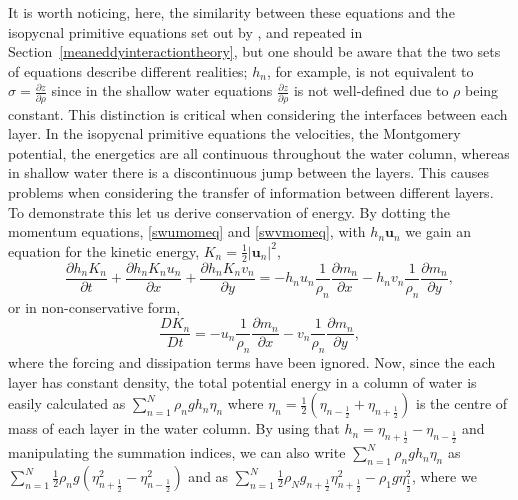 \documentclass[10pt,a4paper]{report}
\newcommand*\secref[1]{Section~\ref{#1}}
\newcommand*{\half}{\frac{1}{2}}
\begin{document}
   It is worth noticing, here, the similarity between these equations and the isopycnal
    primitive    equations set out by \cite{young2012exact}, and repeated in  \secref{meaneddyinteractiontheory}, but one should be aware that
    the two sets of equations describe different realities; $h_{n}$, for example, is not
    equivalent to $\sigma = \frac{\partial z}{\partial \rho}$ since in the shallow water
    equations $\frac{\partial z}{\partial \rho}$ is not well-defined due to  $\rho$ being
    constant. This distinction is critical when considering the interfaces between each
    layer. In the isopycnal primitive equations the velocities, the Montgomery potential, 
    the energetics are all continuous throughout the water column, whereas in shallow 
    water there is a discontinuous jump between the layers. This causes problems when
    considering the transfer of information between different layers. To demonstrate this
    let us derive conservation of energy. By dotting the momentum equations, \ref{swumomeq}
    and \ref{swvmomeq}, with $h_{n}\boldsymbol{u}_{n}$ we gain an equation for the kinetic 
    energy, $K_{n}=\half \left|\boldsymbol{u}_{n}\right|^{2}$,
    \begin{equation}
    \label{swkeeq}
    \frac{\partial h_{n} K_{n}}{\partial t} + \frac{\partial h_{n} K_{n} u_{n}}{\partial x}+
    \frac{\partial h_{n} K_{n} v_{n} }{\partial y} = - h_{n} u_{n}\frac{1}{\rho_{n}}   \frac{\partial m_{n}}{\partial x} - h_{n} v_{n}\frac{1}{\rho_{n}}   \frac{\partial m_{n}}{\partial y},
    \end{equation}
    or in non-conservative form, 
    \begin{equation}
    \frac{D  K_{n}}{D t}  = - u_{n}\frac{1}{\rho_{n}}   \frac{\partial m_{n}}{\partial x} - v_{n}\frac{1}{\rho_{n}}   \frac{\partial m_{n}}{\partial y},
    \end{equation}
    where the forcing and dissipation terms have been ignored. Now, since the
    each layer has constant density, the total potential energy in a column
    of water is easily calculated as $\sum_{n=1}^{N} \rho_{n} g h_{n}\eta_{n}$ where
    $\eta_{n}=\half  \left(\eta_{n-\half }+\eta_{n+\half }\right)$ is
    the centre of mass of each layer in the water column. By using that $h_{n} = \eta_{n+\half }-\eta_{n-\half }$ and manipulating the summation
    indices, we can also write $\sum_{n=1}^{N} \rho_{n} g h_{n}\eta_{n}$ as
    $\sum_{n=1}^{N}\half  \rho_{n} g \left(\eta_{n+\half }^{2}-\eta_{n-\half }^{2}\right)$
    and as $\sum_{n=1}^{N}\half  \rho_{N} g_{n+\half } \eta_{n+\half }^{2}-\rho_{1}g\eta_{\half }^{2}$, where we 
\end{document}
